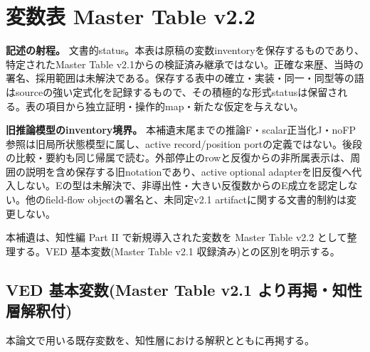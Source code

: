 \section{変数表 Master Table v2.2}

\noindent\textbf{記述の射程。} 文書的status。本表は原稿の変数inventoryを保存するものであり、特定されたMaster Table v2.1からの検証済み継承ではない。正確な来歴、当時の署名、採用範囲は未解決である。保存する表中の確立・実装・同一・同型等の語はsourceの強い定式化を記録するもので、その積極的な形式statusは保留される。表の項目から独立証明・操作的map・新たな仮定を与えない。

\noindent\textbf{旧推論模型のinventory境界。} 本補遺末尾までの推論F・scalar正当化J・noFP参照は旧局所状態模型に属し、active record/position portの定義ではない。後段の比較・要約も同じ帰属で読む。外部停止のrowと反復からの非所属表示は、周囲の説明を含め保存する旧notationであり、active optional adapterを旧反復へ代入しない。Eの型は未解決で、非導出性・大きい反復数からのE成立を認定しない。他のfield-flow objectの署名と、未同定v2.1 artifactに関する文書的制約は変更しない。



本補遺は、知性編 Part II で新規導入された変数を Master Table v2.2 として整理する。VED 基本変数(Master Table v2.1 収録済み)との区別を明示する。

\bigskip


\subsection{VED 基本変数(Master Table v2.1 より再掲・知性層解釈付)}


本論文で用いる既存変数を、知性層における解釈とともに再掲する。

